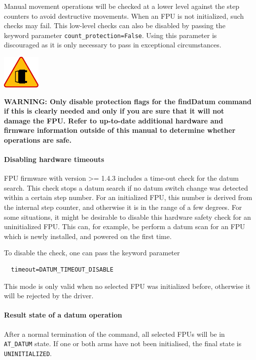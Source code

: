 \documentclass[11pt,a4paper]{scrartcl}
\newenvironment{warning}{\begin{framed}\includegraphics[width=5em]{accident-area-ahead.png}
}{\end{framed}}
\begin{document}
Manual movement operations will be checked at a lower level against
the step counters to avoid destructive movements. When an FPU is not
initialized, such checks may fail. This low-level checks can also be
disabled by passing the keyword parameter
\texttt{count\_protection=False}.  Using this parameter is discouraged
as it is only necessary to pass in exceptional circumstances.

\begin{warning}
  \textbf{WARNING: Only disable protection flags for the findDatum
    command if this is clearly needed and only if you are sure that it
    will not damage the FPU. Refer to up-to-date additional hardware
    and firmware information outside of this manual to determine
    whether operations are safe.}
\end{warning}

\paragraph{Disabling hardware timeouts}

FPU firmware with version >= 1.4.3 includes a time-out check for the
datum search. This check stops a datum search if no datum switch
change was detected within a certain step number. For an initialized
FPU, this number is derived from the internal step counter, and
otherwise it is in the range of a few degrees.  For some situations,
it might be desirable to disable this hardware safety check for an
uninitialized FPU. This can, for example, be perform a datum scan for
an FPU which is newly installed, and powered on the first time.

To disable the check, one can pass the keyword parameter

\begin{verbatim}
  timeout=DATUM_TIMEOUT_DISABLE
\end{verbatim}

This mode is only valid when no selected FPU was initialized before,
otherwise it will be rejected by the driver.


\paragraph{Result state of a datum operation}

After a normal termination of the command, all selected FPUs will be
in \texttt{AT\_DATUM} state. If one or both arms have not been
initialised, the final state is \texttt{UNINITIALIZED}.
\end{document}
